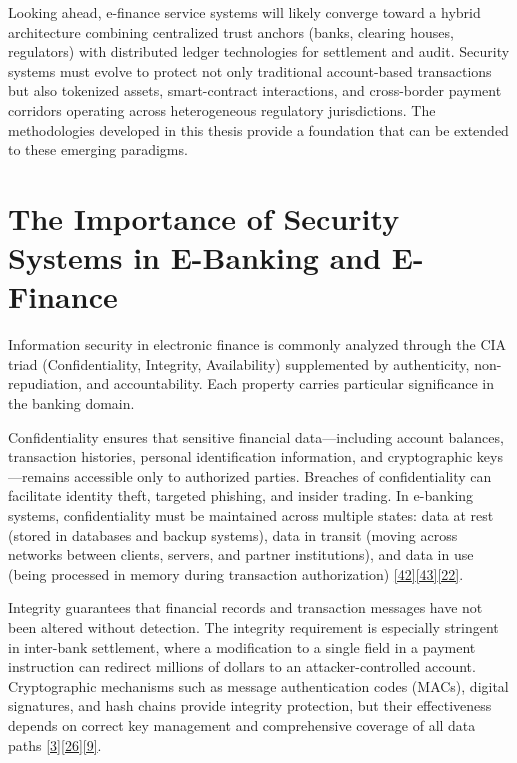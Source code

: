 \indent Looking ahead, e-finance service systems will likely converge toward a hybrid architecture combining centralized trust anchors (banks, clearing houses, regulators) with distributed ledger technologies for settlement and audit. Security systems must evolve to protect not only traditional account-based transactions but also tokenized assets, smart-contract interactions, and cross-border payment corridors operating across heterogeneous regulatory jurisdictions. The methodologies developed in this thesis provide a foundation that can be extended to these emerging paradigms.

\section{The Importance of Security Systems in E-Banking and E-Finance}

\indent Information security in electronic finance is commonly analyzed through the CIA triad (Confidentiality, Integrity, Availability) supplemented by authenticity, non-repudiation, and accountability. Each property carries particular significance in the banking domain.

\indent Confidentiality ensures that sensitive financial data---including account balances, transaction histories, personal identification information, and cryptographic keys---remains accessible only to authorized parties. Breaches of confidentiality can facilitate identity theft, targeted phishing, and insider trading. In e-banking systems, confidentiality must be maintained across multiple states: data at rest (stored in databases and backup systems), data in transit (moving across networks between clients, servers, and partner institutions), and data in use (being processed in memory during transaction authorization) \hyperref[ref:42]{[42]}\hyperref[ref:43]{[43]}\hyperref[ref:22]{[22]}.

\indent Integrity guarantees that financial records and transaction messages have not been altered without detection. The integrity requirement is especially stringent in inter-bank settlement, where a modification to a single field in a payment instruction can redirect millions of dollars to an attacker-controlled account. Cryptographic mechanisms such as message authentication codes (MACs), digital signatures, and hash chains provide integrity protection, but their effectiveness depends on correct key management and comprehensive coverage of all data paths \hyperref[ref:3]{[3]}\hyperref[ref:26]{[26]}\hyperref[ref:9]{[9]}.


